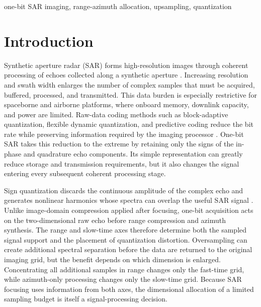 \documentclass[conference]{IEEEtran}
\begin{document}
\begin{IEEEkeywords}
one-bit SAR imaging, range-azimuth allocation, upsampling, quantization
\end{IEEEkeywords}

\section{Introduction}

Synthetic aperture radar (SAR) forms high-resolution images through coherent processing of echoes collected along a synthetic aperture \cite{cumming2005sar,curlander1991sar}. Increasing resolution and swath width enlarges the number of complex samples that must be acquired, buffered, processed, and transmitted. This data burden is especially restrictive for spaceborne and airborne platforms, where onboard memory, downlink capacity, and power are limited. Raw-data coding methods such as block-adaptive quantization, flexible dynamic quantization, and predictive coding reduce the bit rate while preserving information required by the imaging processor \cite{kwok1989baq,attema2010fdbaq,magli2003lossy}. One-bit SAR takes this reduction to the extreme by retaining only the signs of the in-phase and quadrature echo components. Its simple representation can greatly reduce storage and transmission requirements, but it also changes the signal entering every subsequent coherent processing stage.

Sign quantization discards the continuous amplitude of the complex echo and generates nonlinear harmonics whose spectra can overlap the useful SAR signal \cite{franceschetti1999phase,zhao2019onebit}. Unlike image-domain compression applied after focusing, one-bit acquisition acts on the two-dimensional raw echo before range compression and azimuth synthesis. The range and slow-time axes therefore determine both the sampled signal support and the placement of quantization distortion. Oversampling can create additional spectral separation before the data are returned to the original imaging grid, but the benefit depends on which dimension is enlarged. Concentrating all additional samples in range changes only the fast-time grid, while azimuth-only processing changes only the slow-time grid. Because SAR focusing uses information from both axes, the dimensional allocation of a limited sampling budget is itself a signal-processing decision.
\end{document}
